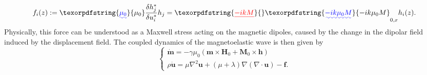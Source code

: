 \documentclass[10pt]{iopart}
\providecommand{\DIFaddtex}[1]{{\protect\color{blue}\uwave{#1}}} %
\providecommand{\DIFdeltex}[1]{{\protect\color{red}\sout{#1}}}                      %
\providecommand{\DIFaddbegin}{} %
\providecommand{\DIFaddend}{} %
\providecommand{\DIFdelbegin}{} %
\providecommand{\DIFdelend}{} %
\providecommand{\DIFadd}[1]{\texorpdfstring{\DIFaddtex{#1}}{#1}} %
\providecommand{\DIFdel}[1]{\texorpdfstring{\DIFdeltex{#1}}{}} %
\newcommand{\DIFscaledelfig}{0.5}
\newlength{\DIFdelgraphicswidth} %
\newlength{\DIFdelgraphicsheight} %
\newcommand{\DIFaddincludegraphics}[2][]{{\color{blue}\fbox{\DIFOincludegraphics[#1]{#2}}}} %
\newcommand{\DIFdelincludegraphics}[2][]{%
\sbox{\DIFdelgraphicsbox}{\DIFOincludegraphics[#1]{#2}}%
\settoboxwidth{\DIFdelgraphicswidth}{\DIFdelgraphicsbox} %
\settoboxtotalheight{\DIFdelgraphicsheight}{\DIFdelgraphicsbox} %
\scalebox{\DIFscaledelfig}{%
\parbox[b]{\DIFdelgraphicswidth}{\usebox{\DIFdelgraphicsbox}\\[-\baselineskip] \rule{\DIFdelgraphicswidth}{0em}}\llap{\resizebox{\DIFdelgraphicswidth}{\DIFdelgraphicsheight}{%
\setlength{\unitlength}{\DIFdelgraphicswidth}%
\begin{picture}(1,1)%
\thicklines\linethickness{2pt} %
{\color[rgb]{1,0,0}\put(0,0){\framebox(1,1){}}}%
{\color[rgb]{1,0,0}\put(0,0){\line( 1,1){1}}}%
{\color[rgb]{1,0,0}\put(0,1){\line(1,-1){1}}}%
\end{picture}%
}\hspace*{3pt}}} %
} %
\DeclareRobustCommand{\DIFaddbegin}{\DIFOaddbegin \let\includegraphics\DIFaddincludegraphics} %
\DeclareRobustCommand{\DIFaddend}{\DIFOaddend \let\includegraphics\DIFOincludegraphics} %
\DeclareRobustCommand{\DIFdelbegin}{\DIFOdelbegin \let\includegraphics\DIFdelincludegraphics} %
\DeclareRobustCommand{\DIFdelend}{\DIFOaddend \let\includegraphics\DIFOincludegraphics} %
\begin{document}
\begin{equation}
    f_i(z):=\DIFaddbegin \DIFadd{\mu_0}\DIFaddend \frac{\delta h^*_j}{\delta u^*_i}h_j=\DIFdelbegin \DIFdel{-ikM}\DIFdelend \DIFaddbegin \DIFadd{-ik\mu_0 M}\DIFaddend _{0,x}h_i(z).
\end{equation}
Physically, this force can be understood as a Maxwell stress acting on the magnetic dipoles, caused by the change in the dipolar field induced by the displacement field. The coupled dynamics of the magnetoelastic wave is then given by
\begin{equation}
    \left\{
    \DIFdelbegin %
\DIFdelend \DIFaddbegin \begin{array}{l}
        \dot{\bm{m}}=-\gamma\mu_0\left(\bm{m}\times\bm{H}_0+\bm{M}_0\times\bm{h}\right)\\
        \rho\ddot{\bm{u}}=\mu\nabla^2\bm{u}+\left(\mu+\lambda\right)\nabla\left(\nabla\cdot\bm{u}\right)-\bm{f}.
    \end{array}\DIFaddend \label{eq:CoupledEOM}
    \right.
\end{equation}
\end{document}

